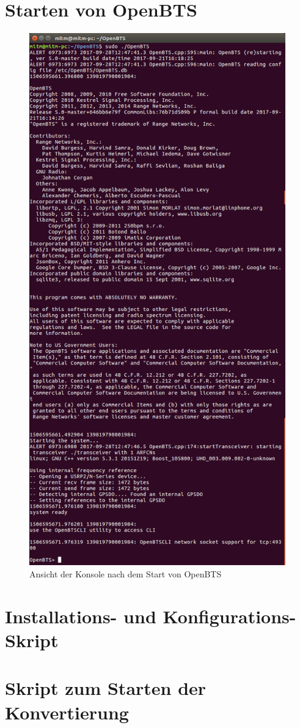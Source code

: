 \newpage
\section{Starten von OpenBTS}\label{startOpenBTS}
\begin{figure}[htbp]
	\centering
		\includegraphics[height=23cm]{includes/Start_OpenBTS}
	\caption{Ansicht der Konsole nach dem Start von OpenBTS}
	\label{fig:start_OpenBTS}
\end{figure}

\newpage
\section{Installations- und Konfigurations-Skript} \label{configureScript}


\newpage
 \section{Skript zum Starten der Konvertierung} \label{startingConvertScript}
 

